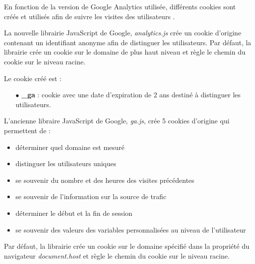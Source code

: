 En fonction de la version de Google Analytics utilisée, différents cookies sont créés et utilisés afin de suivre les visites des utilisateurs \cite{Google_Analytics_cookies}.
\newline

La nouvelle librairie JavaScript de Google, \textit{analytics.js} crée un cookie d'origine contenant un identifiant anonyme afin de distinguer les utilisateurs. Par défaut, la librairie crée un cookie sur le domaine de plus haut niveau et règle le chemin du cookie sur le niveau racine.

Le cookie créé est :
\begin{itemize}
  \item[$\bullet$] \textbf{\_ga} : cookie avec une date d'expiration de 2 ans destiné à distinguer les utilisateurs.
  \newline
\end{itemize}

L'ancienne libraire JavaScript de Google, \textit{ga.js}, crée 5 cookies d'origine qui permettent de :
\begin{itemize}
  \item déterminer quel domaine est mesuré
  \item distinguer les utilisateurs uniques
  \item se souvenir du nombre et des heures des visites précédentes
  \item se souvenir de l'information sur la source de trafic
  \item déterminer le début et la fin de session
  \item se souvenir des valeurs des variables personnalisées au niveau de l'utilisateur
  \newline
\end{itemize}

Par défaut, la librairie crée un cookie sur le domaine spécifié dans la propriété du navigateur \textit{document.host} et règle le chemin du cookie sur le niveau racine.

